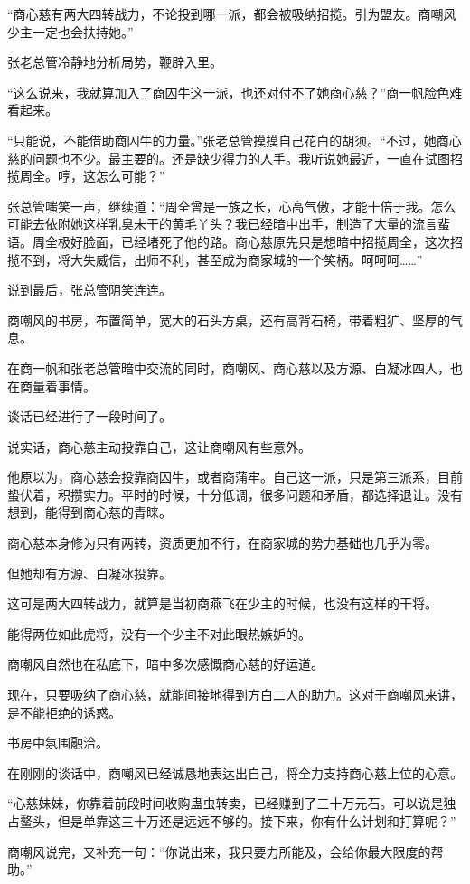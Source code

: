 \begin{this_body}
“商心慈有两大四转战力，不论投到哪一派，都会被吸纳招揽。引为盟友。商嘲风少主一定也会扶持她。”

张老总管冷静地分析局势，鞭辟入里。

“这么说来，我就算加入了商囚牛这一派，也还对付不了她商心慈？”商一帆脸色难看起来。

“只能说，不能借助商囚牛的力量。”张老总管摸摸自己花白的胡须。“不过，她商心慈的问题也不少。最主要的。还是缺少得力的人手。我听说她最近，一直在试图招揽周全。哼，这怎么可能？”

张总管嗤笑一声，继续道：“周全曾是一族之长，心高气傲，才能十倍于我。怎么可能去依附她这样乳臭未干的黄毛丫头？我已经暗中出手，制造了大量的流言蜚语。周全极好脸面，已经堵死了他的路。商心慈原先只是想暗中招揽周全，这次招揽不到，将大失威信，出师不利，甚至成为商家城的一个笑柄。呵呵呵……”

说到最后，张总管阴笑连连。

商嘲风的书房，布置简单，宽大的石头方桌，还有高背石椅，带着粗犷、坚厚的气息。

在商一帆和张老总管暗中交流的同时，商嘲风、商心慈以及方源、白凝冰四人，也在商量着事情。

谈话已经进行了一段时间了。

说实话，商心慈主动投靠自己，这让商嘲风有些意外。

他原以为，商心慈会投靠商囚牛，或者商蒲牢。自己这一派，只是第三派系，目前蛰伏着，积攒实力。平时的时候，十分低调，很多问题和矛盾，都选择退让。没有想到，能得到商心慈的青睐。

商心慈本身修为只有两转，资质更加不行，在商家城的势力基础也几乎为零。

但她却有方源、白凝冰投靠。

这可是两大四转战力，就算是当初商燕飞在少主的时候，也没有这样的干将。

能得两位如此虎将，没有一个少主不对此眼热嫉妒的。

商嘲风自然也在私底下，暗中多次感慨商心慈的好运道。

现在，只要吸纳了商心慈，就能间接地得到方白二人的助力。这对于商嘲风来讲，是不能拒绝的诱惑。

书房中氛围融洽。

在刚刚的谈话中，商嘲风已经诚恳地表达出自己，将全力支持商心慈上位的心意。

“心慈妹妹，你靠着前段时间收购蛊虫转卖，已经赚到了三十万元石。可以说是独占鳌头，但是单靠这三十万还是远远不够的。接下来，你有什么计划和打算呢？”

商嘲风说完，又补充一句：“你说出来，我只要力所能及，会给你最大限度的帮助。”


\end{this_body}
